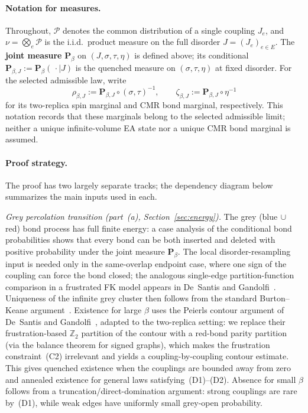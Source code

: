 \documentclass[11pt]{article}
\numberwithin{theorem}{section}
\theoremstyle{remark}
\begin{document}
\paragraph{Notation for measures.}
Throughout, $\mathscr{P}$ denotes the common distribution of a single coupling $J_e$, and $\nu = \bigotimes_e \mathscr{P}$ is the i.i.d.\ product measure on the full disorder $J = (J_e)_{e \in E}$.
The \textbf{joint measure} $\mathbf{P}_\beta$ on $(J, \sigma, \tau, \eta)$ is defined above; its conditional $\mathbf{P}_{\beta,J} := \mathbf{P}_\beta(\,\cdot \mid J)$ is the quenched measure on $(\sigma, \tau, \eta)$ at fixed disorder.
For the selected admissible law, write
\[
  \rho_{\beta,J} := \mathbf{P}_{\beta,J}\circ(\sigma,\tau)^{-1},
  \qquad
  \zeta_{\beta,J} := \mathbf{P}_{\beta,J}\circ\eta^{-1}
\]
for its two-replica spin marginal and CMR bond marginal, respectively.
This notation records that these marginals belong to the selected admissible limit; neither a unique infinite-volume EA state nor a unique CMR bond marginal is assumed.

\paragraph{Proof strategy.}
The proof has two largely separate tracks; the dependency diagram below summarizes the main inputs used in each.

\smallskip\noindent
\textit{Grey percolation transition (part~(a), Section~\ref{sec:energy}).}
The grey (blue$\,\cup\,$red) bond process has full finite energy: a case analysis of the conditional bond probabilities shows that every bond can be both inserted and deleted with positive probability under the joint measure $\mathbf{P}_\beta$.
The local disorder-resampling input is needed only in the same-overlap endpoint case, where one sign of the coupling can force the bond closed; the analogous single-edge partition-function comparison in a frustrated FK model appears in De~Santis and Gandolfi~\cite[Lemma~3.1]{DSG1999}.
Uniqueness of the infinite grey cluster then follows from the standard Burton--Keane argument~\cite{BK1989}.
Existence for large $\beta$ uses the Peierls contour argument of De~Santis and Gandolfi~\cite{DSG1999}, adapted to the two-replica setting: we replace their frustration-based $\mathbb{Z}_2$ partition of the contour with a red-bond parity partition (via the balance theorem for signed graphs), which makes the frustration constraint~(C2) irrelevant and yields a coupling-by-coupling contour estimate. This gives quenched existence when the couplings are bounded away from zero and annealed existence for general laws satisfying~\textup{(D1)--(D2)}.
Absence for small $\beta$ follows from a truncation/direct-domination argument: strong couplings are rare by~\textup{(D1)}, while weak edges have uniformly small grey-open probability.
\end{document}
